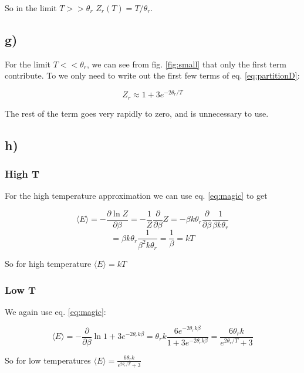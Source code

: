 \documentclass[a4paper,norsk, 10pt]{article}
\newcommand{\pd}[2]{\frac{\partial #1}{\partial #2}}
\begin{document}
So in the limit $T >> \theta_r$ $Z_r(T) = T/\theta_r$.


\subsection{g)}

For the limit $T << \theta_r$, we can see from fig. \ref{fig:small} that only the first term contribute. To we only need to write out the first few terms of eq. \eqref{eq:partitionD}:

\begin{equation}
Z_r \approx 1 + 3e^{-2\theta_r/T}
\end{equation}

The rest of the term goes very rapidly to zero, and is unnecessary to use.

\subsection{h)}
\subsubsection{High T}
For the high temperature approximation we can use eq. \eqref{eq:magic} to get

\begin{equation}
\langle E \rangle = -\pd{\ln Z}{\beta} = -\frac{1}{Z}\pd{}{\beta}Z = - \beta k \theta_r \pd{}{\beta} \frac{1}{\beta k \theta_r}
\end{equation}
\begin{equation}
= \beta k \theta_r \frac{1}{\beta^2 k \theta_r} = \frac{1}{\beta} = kT
\end{equation}\label{eq:highTE}

So for high temperature $\langle E \rangle= kT$

\subsubsection{Low T}
We again use eq. \eqref{eq:magic}:

\begin{equation}
\langle E \rangle = -\pd{}{\beta}\ln 1 +3e^{-2\theta_r k\beta}  = \theta_r k\frac{6e^{-2\theta_r k\beta}}{1 +3e^{-2\theta_r k\beta} } = \frac{6\theta_r k}{e^{2\theta_r/T} + 3}
\end{equation}\label{eq:lowTE}

So for low temperatures $\langle E \rangle = \frac{6\theta_r k}{e^{2\theta_r/T} + 3}$
\end{document}

